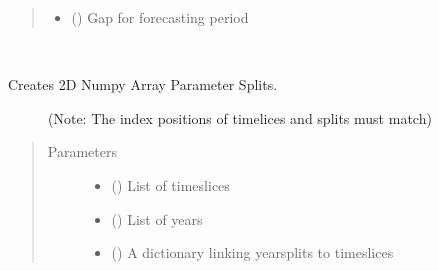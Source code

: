 \documentclass[a4paper,12pt,english]{article}
\begin{document}
\begin{fulllineitems}
\begin{fulllineitems}
\begin{quote}
\begin{description}
\begin{itemize}
\item {} 
 () \textendash{} Gap for forecasting period

\end{itemize}

\end{description}\end{quote}

\end{fulllineitems}


\begin{fulllineitems}
\label{\detokenize{GOCPI:GOCPI.CreateCases.CreateCases.set_year_split}}~\begin{description}
\item[{Creates 2D Numpy Array Parameter Splits.}] \leavevmode
(Note: The index positions of timelices and splits must match)

\end{description}
\begin{quote}\begin{description}
\item[{Parameters}] \leavevmode\begin{itemize}
\item {} 
 () \textendash{} List of timeslices

\item {} 
 () \textendash{} List of years

\item {} 
 () \textendash{} A dictionary linking yearsplits to timeslices

\end{itemize}

\end{description}\end{quote}

\end{fulllineitems}


\end{fulllineitems}
\end{document}
